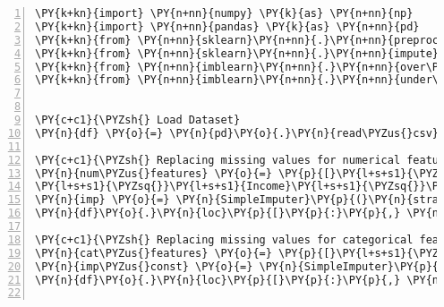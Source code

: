 \documentclass[12pt]{article}
\begin{document}
\begin{Verbatim}[commandchars=\\\{\},numbers=left,firstnumber=1,stepnumber=1,formatcom=\footnotesize]
\PY{k+kn}{import} \PY{n+nn}{numpy} \PY{k}{as} \PY{n+nn}{np}
\PY{k+kn}{import} \PY{n+nn}{pandas} \PY{k}{as} \PY{n+nn}{pd}
\PY{k+kn}{from} \PY{n+nn}{sklearn}\PY{n+nn}{.}\PY{n+nn}{preprocessing} \PY{k+kn}{import} \PY{n}{MinMaxScaler}\PY{p}{,} \PY{n}{OneHotEncoder}
\PY{k+kn}{from} \PY{n+nn}{sklearn}\PY{n+nn}{.}\PY{n+nn}{impute} \PY{k+kn}{import} \PY{n}{SimpleImputer}
\PY{k+kn}{from} \PY{n+nn}{imblearn}\PY{n+nn}{.}\PY{n+nn}{over\PYZus{}sampling} \PY{k+kn}{import} \PY{n}{RandomOverSampler}
\PY{k+kn}{from} \PY{n+nn}{imblearn}\PY{n+nn}{.}\PY{n+nn}{under\PYZus{}sampling} \PY{k+kn}{import} \PY{n}{RandomUnderSampler}


\PY{c+c1}{\PYZsh{} Load Dataset}
\PY{n}{df} \PY{o}{=} \PY{n}{pd}\PY{o}{.}\PY{n}{read\PYZus{}csv}\PY{p}{(}\PY{l+s+s2}{\PYZdq{}}\PY{l+s+s2}{diabetes\PYZus{}binary\PYZus{}health\PYZus{}indicators\PYZus{}BRFSS2015.csv}\PY{l+s+s2}{\PYZdq{}}\PY{p}{)}

\PY{c+c1}{\PYZsh{} Replacing missing values for numerical features}
\PY{n}{num\PYZus{}features} \PY{o}{=} \PY{p}{[}\PY{l+s+s1}{\PYZsq{}}\PY{l+s+s1}{BMI}\PY{l+s+s1}{\PYZsq{}}\PY{p}{,} \PY{l+s+s1}{\PYZsq{}}\PY{l+s+s1}{MentHlth}\PY{l+s+s1}{\PYZsq{}}\PY{p}{,} \PY{l+s+s1}{\PYZsq{}}\PY{l+s+s1}{PhysHlth}\PY{l+s+s1}{\PYZsq{}}\PY{p}{,} \PY{l+s+s1}{\PYZsq{}}\PY{l+s+s1}{Age}\PY{l+s+s1}{\PYZsq{}}\PY{p}{,} \PY{l+s+s1}{\PYZsq{}}\PY{l+s+s1}{Education}\PY{l+s+s1}{\PYZsq{}}\PY{p}{,} \PYZbs{}
\PY{l+s+s1}{\PYZsq{}}\PY{l+s+s1}{Income}\PY{l+s+s1}{\PYZsq{}}\PY{p}{]}
\PY{n}{imp} \PY{o}{=} \PY{n}{SimpleImputer}\PY{p}{(}\PY{n}{strategy}\PY{o}{=}\PY{l+s+s1}{\PYZsq{}}\PY{l+s+s1}{mean}\PY{l+s+s1}{\PYZsq{}}\PY{p}{)}
\PY{n}{df}\PY{o}{.}\PY{n}{loc}\PY{p}{[}\PY{p}{:}\PY{p}{,} \PY{n}{num\PYZus{}features}\PY{p}{]} \PY{o}{=} \PY{n}{imp}\PY{o}{.}\PY{n}{fit\PYZus{}transform}\PY{p}{(}\PY{n}{df}\PY{p}{[}\PY{n}{num\PYZus{}features}\PY{p}{]}\PY{p}{)}

\PY{c+c1}{\PYZsh{} Replacing missing values for categorical features}
\PY{n}{cat\PYZus{}features} \PY{o}{=} \PY{p}{[}\PY{l+s+s1}{\PYZsq{}}\PY{l+s+s1}{CholCheck}\PY{l+s+s1}{\PYZsq{}}\PY{p}{]}
\PY{n}{imp\PYZus{}const} \PY{o}{=} \PY{n}{SimpleImputer}\PY{p}{(}\PY{n}{strategy}\PY{o}{=}\PY{l+s+s1}{\PYZsq{}}\PY{l+s+s1}{constant}\PY{l+s+s1}{\PYZsq{}}\PY{p}{,} \PY{n}{fill\PYZus{}value}\PY{o}{=}\PY{l+m+mi}{0}\PY{p}{)}
\PY{n}{df}\PY{o}{.}\PY{n}{loc}\PY{p}{[}\PY{p}{:}\PY{p}{,} \PY{n}{cat\PYZus{}features}\PY{p}{]} \PY{o}{=} \PY{n}{imp\PYZus{}const}\PY{o}{.}\PY{n}{fit\PYZus{}transform}\PY{p}{(}\PY{n}{df}\PY{p}{[}\PY{n}{cat\PYZus{}features}\PY{p}{]}\PY{p}{)}


\end{Verbatim}
\end{document}
